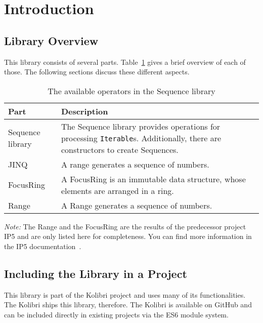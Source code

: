 \section{Introduction} %
\label{sec:Introduction}

\subsection{Library Overview} %
\label{sub:Sequence Library Overview}
This library consists of several parts. Table~\ref{tab:library_overview} gives a brief
overview of each of those. The following sections discuss these different
aspects.

\begin{table}[H]
  \centering
  \begin{tabularx}{\textwidth}{| l | X |} \hline
    \textbf{Part} & \textbf{Description} \\ \hline
    Sequence library & The Sequence library provides operations for processing \lstinline{Iterable}s. Additionally, there are constructors to create Sequences.\\ \hline 
    JINQ & A range generates a sequence of numbers. \\ \hline 
    FocusRing & A FocusRing is an immutable data structure, whose elements are arranged in a ring. \\ \hline 
    Range & A Range generates a sequence of numbers. \\ \hline 
  \end{tabularx}
  \caption{The available operators in the Sequence library}
  \label{tab:library_overview}
\end{table}

\textit{Note:} The Range and the FocusRing are the results of the predecessor
project IP5 and are only listed here for completeness. You can find more
information in the IP5 documentation~\cite{wild_ip5_2023}. 

\subsection{Including the Library in a Project} %
This library is part of the Kolibri project and uses many of its
functionalities. The Kolibri ships this library, therefore. The Kolibri
is available on GitHub and can be included directly in existing projects via
the ES6 module system.
\label{sub:Including the Library in a Project}
